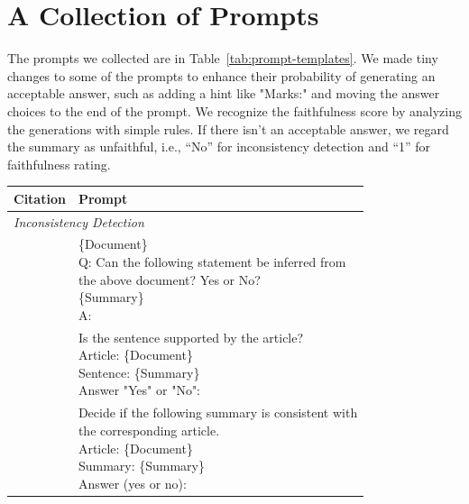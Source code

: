 \section{A Collection of Prompts}
\label{sec:appendix-prompt}

The prompts we collected are in Table~\ref{tab:prompt-templates}. We made tiny changes to some of the prompts to enhance their probability of generating an acceptable answer, such as adding a hint like "Marks:" and moving the answer choices to the end of the prompt.
We recognize the faithfulness score by analyzing the generations with simple rules. If there isn't an acceptable answer, we regard the summary as unfaithful, i.e., ``No'' for inconsistency detection and ``1'' for faithfulness rating.

\begin{table}[h!]
	\scriptsize
	\centering
	\begin{tabular}{l|p{4.85cm}}
		\toprule[1pt]
		 Citation & Prompt \\
		\hline
		\multicolumn{2}{l}{\textit{Inconsistency Detection}} \\
		 \citet{chen2023evaluating} &\makecell[l]{\{Document\} \\Q: Can the following statement be inferred from \\the above document? Yes or No?\\\{Summary\}\\A:} \\
		\hline
		  \citet{gao2023human} &\makecell[l]{Is the sentence supported by the article?\\Article: \{Document\}\\Sentence: \{Summary\}\\Answer "Yes" or "No":} \\
		\hline
		\citet{luo2023chatgpt} & \makecell[l]{Decide if the following summary is consistent with \\the corresponding article.\\Article: \{Document\}\\Summary: \{Summary\}\\Answer (yes or no):} \\
		\hline
		

\end{tabular}
\end{table}
